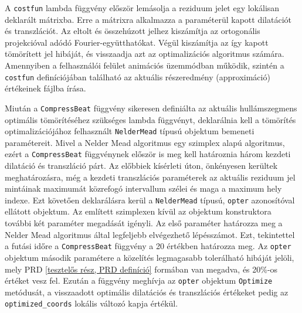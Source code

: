 \documentclass[oneside,titlepage,12pt,a4paper]{report}
\begin{document}
\par A \texttt{costfun} lambda függvény először lemásolja a reziduum jelet egy lokálisan deklarált mátrixba. Erre a mátrixra alkalmazza a paraméterül kapott dilatációt és transzlációt. Az eltolt és összehúzott jelhez kiszámítja az ortogonális projekcióval adódó Fourier-együtthatókat. Végül kiszámítja az így kapott tömörített jel hibáját, és visszaadja azt az optimalizációs algoritmus számára. Amennyiben a felhasználói felület animációs üzemmódban működik, szintén a \texttt{costfun} definíciójában található az aktuális részeredmény (approximáció) értékeinek fájlba írása. 
\par Miután a \texttt{CompressBeat} függvény sikeresen definiálta az aktuális hullámszegmens optimális tömörítéséhez szükséges lambda függvényt, deklarálnia kell a tömörítés optimalizációjához felhasznált \texttt{NelderMead} típusú objektum bemeneti paramétereit. Mivel a Nelder Mead algoritmus egy szimplex alapú algoritmus, ezért a \texttt{CompressBeat} függvénynek először is meg kell határoznia három kezdeti dilatáció és transzláció párt. Az előbbiek kísérleti úton, önkényesen kerültek meghatározásra, még a kezdeti transzlációs paraméterek az aktuális reziduum jel mintáinak maximumát közrefogó intervallum szélei és maga a maximum hely indexe. Ezt követően deklarálásra kerül a \texttt{NelderMead} típusú, \texttt{opter} azonosítóval ellátott objektum. Az említett szimplexen kívül az objektum konstruktora további két paraméter megadását igényli. Az első paraméter határozza meg a Nelder Mead algoritmus által legfeljebb elvégezhető lépésszámot. Ezt, tekintettel a futási időre a \texttt{CompressBeat} függvény a 20 értékben határozza meg. Az \texttt{opter} objektum második paramétere a közelítés legmagasabb tolerálható hibáját jelöli, mely PRD \ref{tesztelős rész, PRD definíció} formában van megadva, és 20\%-os értéket vesz fel. Ezután a függvény meghívja az \texttt{opter} objektum \texttt{Optimize} metódusát, a visszaadott optimális dilatációs és transzlációs értékeket pedig az \texttt{optimized\_coords} lokális változó kapja értékül. 
\end{document}
